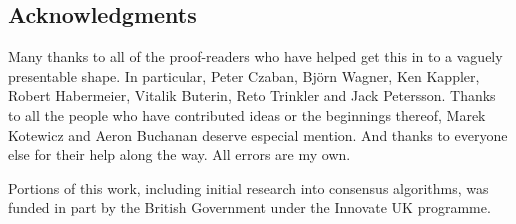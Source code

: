 \documentclass[9pt,oneside]{amsart}
\begin{document}
\begin{multicols}{2}

\subsection{Acknowledgments}

 Many thanks to all of the proof-readers who have helped get this in to a vaguely presentable shape. In particular, Peter Czaban, Bj{\"o}rn Wagner, Ken Kappler, Robert Habermeier, Vitalik Buterin, Reto Trinkler and Jack Petersson. Thanks to all the people who have contributed ideas or the beginnings thereof, Marek Kotewicz and Aeron Buchanan deserve especial mention. And thanks to everyone else for their help along the way. All errors are my own.

 Portions of this work, including initial research into consensus algorithms, was funded in part by the British Government under the Innovate UK programme.

{}


\end{multicols}

\appendix
%


\end{document}
